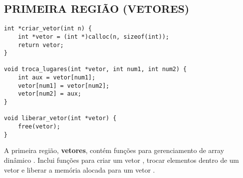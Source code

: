 \documentclass[12pt, openright, oneside, a4paper, chapter=TITLE, section=TITLE, subsection=TITLE, subsubsection=TITLE, brazil]{abntex2}
\newenvironment{codebox}%
  {\begin{mdframed}[backgroundcolor=gray!5, linecolor=gray, roundcorner=5pt]}%
  {\end{mdframed}}
\begin{document}
\subsection{PRIMEIRA REGIÃO (VETORES)}
\begin{codebox}
\begin{verbatim}
int *criar_vetor(int n) {
    int *vetor = (int *)calloc(n, sizeof(int));
    return vetor;
}

void troca_lugares(int *vetor, int num1, int num2) {
    int aux = vetor[num1];
    vetor[num1] = vetor[num2];
    vetor[num2] = aux;
}

void liberar_vetor(int *vetor) {
    free(vetor);
}
\end{verbatim}
\end{codebox}
A primeira região, \textbf{vetores}, contém funções para gerenciamento de array dinâmico . Inclui funções para criar um vetor , trocar elementos dentro de um vetor  e liberar a memória alocada para um vetor .
\end{document}
